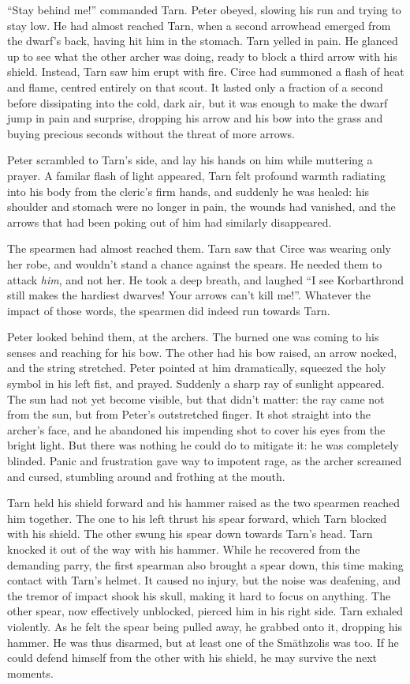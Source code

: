 ``Stay behind me!'' commanded Tarn.  Peter obeyed, slowing his run and trying to stay low.  He had almost reached Tarn, when a second arrowhead emerged from the dwarf's back, having hit him in the stomach.  Tarn yelled in pain.  He glanced up to see what the other archer was doing, ready to block a third arrow with his shield.  Instead, Tarn saw him erupt with fire.  Circe had summoned a flash of heat and flame, centred entirely on that scout.  It lasted only a fraction of a second before dissipating into the cold, dark air, but it was enough to make the dwarf jump in pain and surprise, dropping his arrow and his bow into the grass and buying precious seconds without the threat of more arrows.

Peter scrambled to Tarn's side, and lay his hands on him while muttering a prayer.  A familar flash of light appeared, Tarn felt profound warmth radiating into his body from the cleric's firm hands, and suddenly he was healed: his shoulder and stomach were no longer in pain, the wounds had vanished, and the arrows that had been poking out of him had similarly disappeared.

The spearmen had almost reached them.  Tarn saw that Circe was wearing only her robe, and wouldn't stand a chance against the spears.  He needed them to attack \emph{him}, and not her.  He took a deep breath, and laughed ``I see Korbarthrond still makes the hardiest dwarves!  Your arrows can't kill me!''.  Whatever the impact of those words, the spearmen did indeed run towards Tarn.

Peter looked behind them, at the archers.  The burned one was coming to his senses and reaching for his bow.  The other had his bow raised, an arrow nocked, and the string stretched.  Peter pointed at him dramatically, squeezed the holy symbol in his left fist, and prayed.  Suddenly a sharp ray of sunlight appeared.  The sun had not yet become visible, but that didn't matter: the ray came not from the sun, but from Peter's outstretched finger.  It shot straight into the archer's face, and he abandoned his impending shot to cover his eyes from the bright light.  But there was nothing he could do to mitigate it: he was completely blinded.  Panic and frustration gave way to impotent rage, as the archer screamed and cursed, stumbling around and frothing at the mouth.

Tarn held his shield forward and his hammer raised as the two spearmen reached him together.  The one to his left thrust his spear forward, which Tarn blocked with his shield.  The other swung his spear down towards Tarn's head.  Tarn knocked it out of the way with his hammer.  While he recovered from the demanding parry, the first spearman also brought a spear down, this time making contact with Tarn's helmet.  It caused no injury, but the noise was deafening, and the tremor of impact shook his skull, making it hard to focus on anything.  The other spear, now effectively unblocked, pierced him in his right side.  Tarn exhaled violently.  As he felt the spear being pulled away, he grabbed onto it, dropping his hammer.  He was thus disarmed, but at least one of the Sm\=athzolis was too.  If he could defend himself from the other with his shield, he may survive the next moments.

